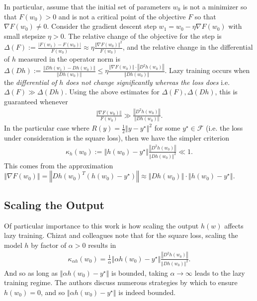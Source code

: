 \documentclass{article}
\begin{document}
In particular, assume that the initial set of parameters $w_0$ is not a minimizer so that $F(w_0) > 0$ and is not a critical point of the objective $F$ so that $\nabla F(w_0) \neq 0$. Consider the gradient descent step $w_1 = w_0 - \eta \nabla F(w_0)$ with small stepsize $\eta > 0$. The relative change of the objective for the step is $\Delta(F) := \frac{\left| F(w_1) - F(w_0) \right|}{F(w_0)} \approx \eta \frac{\left\Vert \nabla F(w_0) \right\Vert^2}{F(w_0)}$, and the relative change in the differential of $h$ measured in the operator norm is $\Delta(Dh) := \frac{\left\Vert Dh(w_1) - Dh(w_0) \right\Vert}{\left\Vert Dh(w_0) \right\Vert} \leq \eta \frac{\left\Vert \nabla F(w_0) \right\Vert \cdot \left\Vert D^2h(w_0) \right\Vert}{\left\Vert Dh(w_0)\right\Vert }$. Lazy training occurs when the \textit{differential of $h$ does not change significantly whereas the loss does} i.e. $\Delta(F) \gg \Delta(Dh)$. Using the above estimates for $\Delta(F), \Delta(Dh)$, this is guaranteed whenever
\begin{align*}
    \frac{\left\Vert \nabla F(w_0) \right\Vert}{F(w_0)} \gg \frac{\left\Vert D^2h(w_0)\right\Vert}{\left\Vert Dh(w_0)\right\Vert}.
\end{align*}
In the particular case where $R(y) = \frac{1}{2} \left\Vert y - y^{\star} \right\Vert^2$ for some $y^{\star} \in \mathcal{F}$ (i.e. the loss under consideration is the square loss), then we have the simpler criterion
\begin{align*}
    \kappa_h(w_0) := \left\Vert h(w_0) - y^{\star} \right\Vert \frac{\left\Vert D^2 h(w_0)\right\Vert}{\left\Vert D h(w_0)\right\Vert^2} \ll 1.
\end{align*}
This comes from the approximation $\left\Vert \nabla F(w_0) \right\Vert = \left\Vert Dh(w_0)^T(h(w_0) - y^{\star}) \right\Vert \approx \left\Vert Dh(w_0) \right\Vert \cdot \left\Vert h(w_0) - y^{\star} \right\Vert$.

\subsection{Scaling the Output}
Of particular importance to this work is how scaling the output $h(w)$ affects lazy training. Chizat and colleagues note that for the square loss, scaling the model $h$ by factor of $\alpha > 0$ results in 
\begin{align*}
    \kappa_{\alpha h}(w_0) = \frac{1}{\alpha} \left\Vert \alpha h(w_0) - y^{\star} \right\Vert \frac{\left\Vert D^2 h(w_0) \right\Vert}{\left\Vert Dh(w_0) \right\Vert^2}.
\end{align*}
And so as long as $\left\Vert \alpha h(w_0) - y^{\star} \right\Vert$ is bounded, taking $\alpha \rightarrow \infty$ leads to the lazy training regime. The authors discuss numerous strategies by which to ensure $h(w_0) = 0$, and so $\left\Vert \alpha h(w_0) - y^{\star} \right\Vert$ is indeed bounded.
\end{document}
